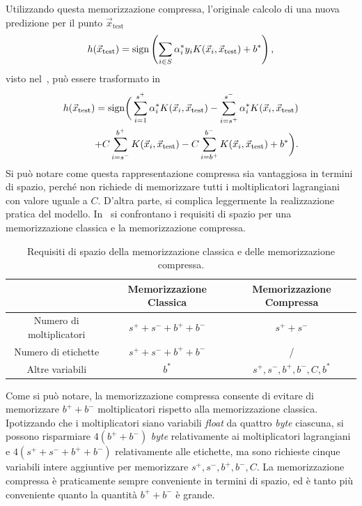 Utilizzando questa memorizzazione compressa, l'originale calcolo di una nuova predizione per il punto $\Vec{x}_{\text{test}}$
\begin{equation*}
    h(\Vec{x}_{\text{test}}) = \mathrm{sign}\left(\sum_{i \in S}\alpha_i^*y_iK(\Vec{x}_i, \Vec{x}_\text{test}) + b^*\right),
\end{equation*}
visto nel~, può essere trasformato in
\begin{align*}
    h(\Vec{x}_{\text{test}}) = \mathrm{sign}\bigg(
            \sum_{i=1}^{s^+}\alpha_i^*K(\Vec{x}_i, \Vec{x}_\text{test}) 
            -\sum_{i=s^+}^{s^-}\alpha_i^*K(\Vec{x}_i, \Vec{x}_\text{test})\\
            +C\sum_{i=s^-}^{b^+}K(\Vec{x}_i, \Vec{x}_\text{test})
            -C\sum_{i=b^+}^{b^-}K(\Vec{x}_i, \Vec{x}_\text{test}) 
            + b^*
        \bigg).
\end{align*}
Si può notare come questa rappresentazione compressa sia vantaggiosa in termini di spazio, perché non richiede di memorizzare tutti i moltiplicatori lagrangiani con valore uguale a $C$.
D'altra parte, si complica leggermente la realizzazione pratica del modello.
In~ si confrontano i requisiti di spazio per una memorizzazione classica e la memorizzazione compressa.
\begin{table}
    \centering
    \begin{tabular}{c|c|c}
    \multicolumn{1}{c}{}    &  Memorizzazione Classica    & Memorizzazione Compressa \\     
    \toprule
    Numero di moltiplicatori    & $s^+ + s^- + b^+ + b^-$ & $s^+ +s^-$ \\
    \hline
    Numero di etichette         & $s^+ + s^- + b^+ + b^-$ &  / \\
    \hline
    Altre variabili             &         $b^*$          &  $s^+, s^-, b^+, b^-, C, b^*$ \\
    \bottomrule
    \end{tabular}
    \caption{Requisiti di spazio della memorizzazione classica e delle memorizzazione compressa.}
    \label{tab:compressione_spazio_risparmiato}
\end{table}
Come si può notare, la memorizzazione compressa consente di evitare di memorizzare $b^++b^-$ moltiplicatori rispetto alla memorizzazione classica.
Ipotizzando che i moltiplicatori siano variabili \emph{float} da quattro \emph{byte} ciascuna, si possono risparmiare $4(b^++b^-)$ \emph{byte} relativamente ai moltiplicatori lagrangiani e $4(s^+ + s^- + b^+ + b^-)$ relativamente alle etichette, ma sono richieste cinque variabili intere aggiuntive per memorizzare $s^+, s^-, b^+, b^-, C$.
La memorizzazione compressa è praticamente sempre conveniente in termini di spazio, ed è tanto più conveniente quanto la quantità $b^++b^-$ è grande.

